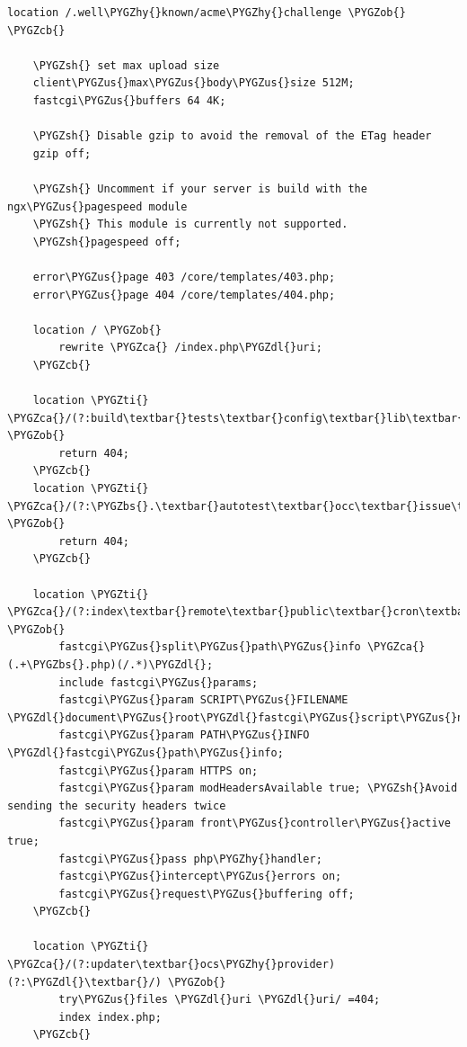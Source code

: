 \documentclass[letterpaper,10pt,english]{sphinxmanual}
\def\PYGZbs{\char`\\}
\def\PYGZus{\char`\_}
\def\PYGZob{\char`\{}
\def\PYGZcb{\char`\}}
\def\PYGZca{\char`\^}
\def\PYGZsh{\char`\#}
\def\PYGZdl{\char`\$}
\def\PYGZhy{\char`\-}
\def\PYGZti{\char`\~}
\begin{document}
\begin{Verbatim}[commandchars=\\\{\}]
    location /.well\PYGZhy{}known/acme\PYGZhy{}challenge \PYGZob{} \PYGZcb{}

    \PYGZsh{} set max upload size
    client\PYGZus{}max\PYGZus{}body\PYGZus{}size 512M;
    fastcgi\PYGZus{}buffers 64 4K;

    \PYGZsh{} Disable gzip to avoid the removal of the ETag header
    gzip off;

    \PYGZsh{} Uncomment if your server is build with the ngx\PYGZus{}pagespeed module
    \PYGZsh{} This module is currently not supported.
    \PYGZsh{}pagespeed off;

    error\PYGZus{}page 403 /core/templates/403.php;
    error\PYGZus{}page 404 /core/templates/404.php;

    location / \PYGZob{}
        rewrite \PYGZca{} /index.php\PYGZdl{}uri;
    \PYGZcb{}

    location \PYGZti{} \PYGZca{}/(?:build\textbar{}tests\textbar{}config\textbar{}lib\textbar{}3rdparty\textbar{}templates\textbar{}data)/ \PYGZob{}
        return 404;
    \PYGZcb{}
    location \PYGZti{} \PYGZca{}/(?:\PYGZbs{}.\textbar{}autotest\textbar{}occ\textbar{}issue\textbar{}indie\textbar{}db\PYGZus{}\textbar{}console) \PYGZob{}
        return 404;
    \PYGZcb{}

    location \PYGZti{} \PYGZca{}/(?:index\textbar{}remote\textbar{}public\textbar{}cron\textbar{}core/ajax/update\textbar{}status\textbar{}ocs/v[12]\textbar{}updater/.+\textbar{}ocs\PYGZhy{}provider/.+\textbar{}core/templates/40[34])\PYGZbs{}.php(?:\PYGZdl{}\textbar{}/) \PYGZob{}
        fastcgi\PYGZus{}split\PYGZus{}path\PYGZus{}info \PYGZca{}(.+\PYGZbs{}.php)(/.*)\PYGZdl{};
        include fastcgi\PYGZus{}params;
        fastcgi\PYGZus{}param SCRIPT\PYGZus{}FILENAME \PYGZdl{}document\PYGZus{}root\PYGZdl{}fastcgi\PYGZus{}script\PYGZus{}name;
        fastcgi\PYGZus{}param PATH\PYGZus{}INFO \PYGZdl{}fastcgi\PYGZus{}path\PYGZus{}info;
        fastcgi\PYGZus{}param HTTPS on;
        fastcgi\PYGZus{}param modHeadersAvailable true; \PYGZsh{}Avoid sending the security headers twice
        fastcgi\PYGZus{}param front\PYGZus{}controller\PYGZus{}active true;
        fastcgi\PYGZus{}pass php\PYGZhy{}handler;
        fastcgi\PYGZus{}intercept\PYGZus{}errors on;
        fastcgi\PYGZus{}request\PYGZus{}buffering off;
    \PYGZcb{}

    location \PYGZti{} \PYGZca{}/(?:updater\textbar{}ocs\PYGZhy{}provider)(?:\PYGZdl{}\textbar{}/) \PYGZob{}
        try\PYGZus{}files \PYGZdl{}uri \PYGZdl{}uri/ =404;
        index index.php;
    \PYGZcb{}


\end{Verbatim}
\end{document}
